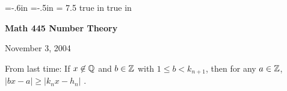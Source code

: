 \def\cmb{\MidnightBlue}	  %
\def\cnb{\NavyBlue}	  %
\def\crb{\RoyalBlue}	  %
\def\cce{\Cerulean}	  %
\def\ccy{\Cyan}		  %
\def\cpb{\ProcessBlue}	  %
\def\csb{\SkyBlue}	  %
\def\ctu{\Turquoise}	  %
\def\ctb{\TealBlue}	  %
\def\caq{\Aquamarine}	  %
\def\cbg{\BlueGreen}	  %
\def\cem{\Emerald}	  %
\def\cjg{\JungleGreen}	  %
\def\csg{\SeaGreen}	  %
\def\cgg{\Green}	  %
\def\cfg{\ForestGreen}	  %
\def\cpg{\PineGreen}	  %
\def\clg{\LimeGreen}	  %
\def\cyg{\YellowGreen}	  %
\def\cspg{\SpringGreen}	  %
\def\cog{\OliveGreen}	  %
\def\pars{\RawSienna}	  %
\def\cse{\Sepia}		  %
\def\cbr{\Brown}		  %
\def\cta{\Tan}		  %
\def\cgr{\Gray}		  %
\def\cbl{\Black}		  %
\def\cwh{\White}		  %


\voffset=-.6in
\hoffset=-.5in
\hsize = 7.5 true in
 true in


\overfullrule=0pt


\def\ctln{\centerline}
\def\u{\underbar}
\def\ssk{\smallskip}
\def\msk{\medskip}
\def\bsk{\bigskip}
\def\hsk{\hskip.1in}
\def\hhsk{\hskip.2in}
\def\dsl{\displaystyle}

\def\lra{$\Leftrightarrow$ }


\ctln{\bf Math 445 Number Theory}

\smallskip

\ctln{November 3, 2004}

\medskip

From last time: If $x\not\in{\Bbb Q}$ and $b\in{\Bbb Z}$ with $1\leq b < k_{n+1}$, then for 
any $a\in{\Bbb Z}$,  $|bx-a|\geq|k_n x-h_n|$ . 

